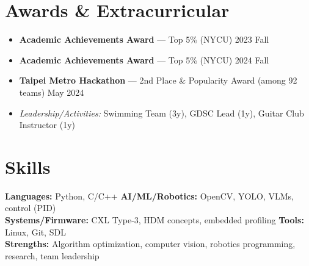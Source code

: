 \documentclass[10pt,letterpaper]{article}
\begin{document}
\section*{Awards \& Extracurricular}
\begin{itemize}[leftmargin=1.2em,itemsep=2pt,topsep=2pt]
  \item \textbf{Academic Achievements Award} — Top 5\% (NYCU) \hfill 2023 Fall
  \item \textbf{Academic Achievements Award} — Top 5\% (NYCU) \hfill 2024 Fall
  \item \textbf{Taipei Metro Hackathon} — 2nd Place \& Popularity Award (among 92 teams) \hfill May 2024
  \item \textit{Leadership/Activities:} Swimming Team (3y), GDSC Lead (1y), Guitar Club Instructor (1y)
\end{itemize}

\section*{Skills}
\textbf{Languages:} Python, C/C++ \qquad
\textbf{AI/ML/Robotics:} OpenCV, YOLO, VLMs, control (PID) \\
\textbf{Systems/Firmware:} CXL Type-3, HDM concepts, embedded profiling \qquad
\textbf{Tools:} Linux, Git, SDL \\
\textbf{Strengths:} Algorithm optimization, computer vision, robotics programming, research, team leadership
\end{document}
